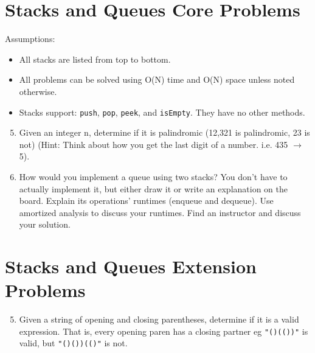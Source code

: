 \documentclass{article}
\begin{document}
\section*{Stacks and Queues Core Problems}

Assumptions:

\begin{itemize}
  \item All stacks are listed from top to bottom.
  \item All problems can be solved using O(N) time and O(N) space unless noted otherwise.
  \item Stacks support: \texttt{push}, \texttt{pop}, \texttt{peek}, and \texttt{isEmpty}. They have no other methods.
\end{itemize}


\begin{enumerate}

\setcounter{enumi}{4}

\item Given an integer n, determine if it is palindromic (12,321 is palindromic, 23 is not) (Hint: Think about how you get the last digit of a number. i.e. 435 $\rightarrow$ 5).

\item How would you implement a queue using two stacks? You don’t have to actually implement it, but either draw it or write an explanation on the board. Explain its operations’ runtimes (enqueue and dequeue). Use amortized analysis to discuss your runtimes. Find an instructor and discuss your solution.
\end{enumerate}

\section*{Stacks and Queues Extension Problems}
\begin{enumerate}

\setcounter{enumi}{4}

\item Given a string of opening and closing parentheses, determine if it is a valid expression. That is, every opening paren has a closing partner eg \texttt{"()(())"} is valid, but \texttt{"()())(()"} is not.

\end{enumerate}


\clearpage
\end{document}
